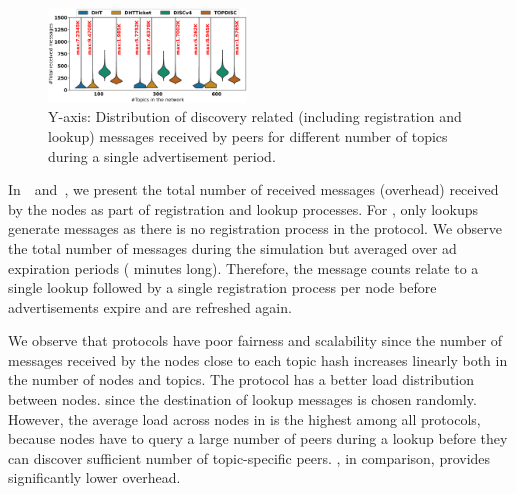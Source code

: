 	
\begin{figure}
\centering
\includegraphics[width=0.470\textwidth]{results/no_split/violin_topic_totalMsg.eps}
\caption{Y-axis: Distribution of discovery related (including registration and lookup) messages received by peers for different number of topics during a single advertisement period.}
\label{fig:msgsPerTopic}
\vspace{-0.15in}
\end{figure}

In~~and~, we present the total number of received messages (\ie overhead) received by the nodes as part of registration and lookup processes. For \discv, only lookups generate messages as there is no registration process in the protocol.
We observe the total number of messages during the simulation but averaged over ad expiration periods ( minutes long). Therefore, the message counts relate to a single lookup followed by a single registration process per node before advertisements expire and are refreshed again. 

We observe that \altname protocols have poor fairness and scalability since the number of messages received by the nodes close to each topic hash increases linearly both 
in the number of nodes and topics. 
The \discv protocol has a better load distribution between nodes. since the destination of lookup messages is chosen randomly. However, the average load across nodes in \discv is the highest among all protocols, because nodes have to query a large number of peers during a lookup before they can discover sufficient number of topic-specific peers.
\sysname, in comparison, provides significantly lower overhead.


